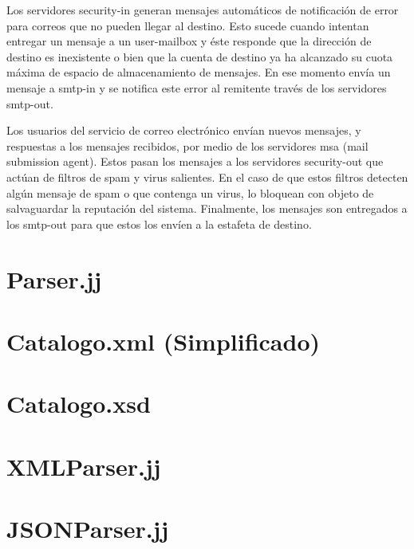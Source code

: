 Los servidores security-in generan mensajes automáticos de notificación de error para correos que no pueden llegar al destino. Esto sucede cuando intentan entregar un mensaje a un user-mailbox y éste responde que la dirección de destino es inexistente o bien que la cuenta de destino ya ha alcanzado su cuota máxima de espacio de almacenamiento de mensajes. En ese momento envía un mensaje a smtp-in y se notifica este error al remitente través de los servidores smtp-out.

Los usuarios del servicio de correo electrónico envían nuevos mensajes, y respuestas a los mensajes recibidos, por medio de los servidores msa (mail submission agent). Estos pasan los mensajes a los servidores security-out que actúan de filtros de spam y virus salientes. En el caso de que estos filtros detecten algún mensaje de spam o que contenga un virus, lo bloquean con objeto de salvaguardar la reputación del sistema. Finalmente, los mensajes son entregados a los smtp-out para que estos los envíen a la estafeta de destino.

\newpage
\section{Parser.jj}
\label{sec:P2Parser}
\lstset{inputencoding=utf8/latin1}


\newpage
\section{Catalogo.xml (Simplificado)}
\label{sec:catalogoxml}
\lstset{inputencoding=utf8/latin1}


\newpage
\section{Catalogo.xsd }
\label{sec:catalogoxsd}
\lstset{inputencoding=utf8/latin1}


\newpage
\section{XMLParser.jj}
\label{sec:XMLParser}
\lstset{inputencoding=utf8/latin1}


\newpage
\section{JSONParser.jj}
\label{sec:JSONParser}
\lstset{inputencoding=utf8/latin1}


\restoregeometry